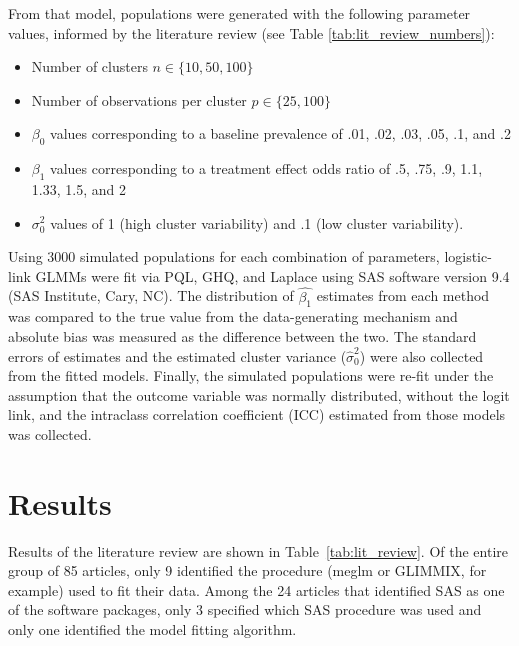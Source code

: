 \documentclass{article}
\begin{document}
\begin{flushleft}
From that model, populations were generated with the following parameter values, informed by the literature review (see Table \ref{tab:lit_review_numbers}):
\begin{itemize}
    \item Number of clusters $n \in \{10, 50, 100\}$
    \item Number of observations per cluster $p \in \{25, 100\}$
    \item $\beta_0$ values corresponding to a baseline prevalence of .01, .02, .03, .05, .1, and .2
    \item $\beta_1$ values corresponding to a treatment effect odds ratio of .5, .75, .9, 1.1, 1.33, 1.5, and 2
    \item $\sigma^2_0$ values of 1 (high cluster variability) and .1 (low cluster variability).
\end{itemize}

Using 3000 simulated populations for each combination of parameters, logistic-link GLMMs were fit via PQL, GHQ, and Laplace using SAS software version 9.4 (SAS Institute, Cary, NC).
The distribution of $\hat{\beta_1}$ estimates from each method was compared to the true value from the data-generating mechanism and absolute bias was measured as the difference between the two. The standard errors of estimates and the estimated cluster variance ($\hat{\sigma}^2_0$) were also collected from the fitted models. Finally, the simulated populations were re-fit under the assumption that the outcome variable was normally distributed, without the logit link, and the intraclass correlation coefficient (ICC) estimated from those models was collected.




\section{Results}

Results of the literature review are shown in Table~\ref{tab:lit_review}. Of the entire group of 85 articles, only 9 identified the procedure (meglm or GLIMMIX, for example) used to fit their data. Among the 24 articles that identified SAS as one of the software packages, only 3 specified which SAS procedure was used and only one identified the model fitting algorithm.


\end{flushleft}
\end{document}

